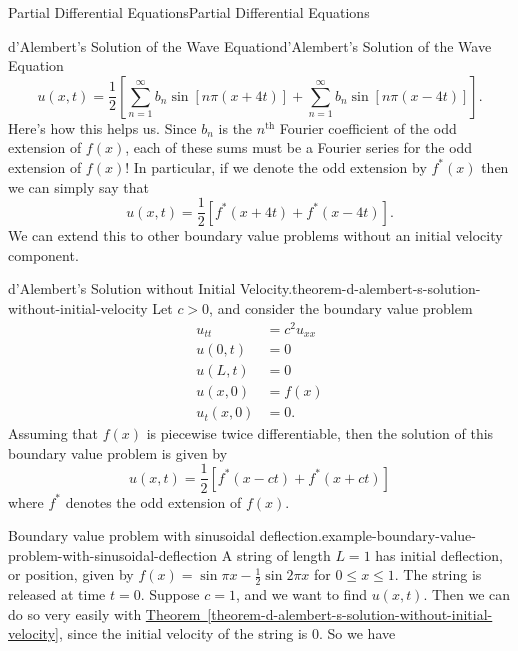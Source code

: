 \documentclass[10pt,]{book}
\numberwithin{equation}{section}
\renewcommand{\th}{\text{th}}
\newcommand{\gt}{>}
\begin{document}
\begin{chapterptx}{Partial Differential Equations}{}{Partial Differential Equations}{}{}
\begin{sectionptx}{d'Alembert's Solution of the Wave Equation}{}{d'Alembert's Solution of the Wave Equation}{}{}
%
\begin{equation*}
u(x,t) = \frac{1}{2}\left[\sum_{n=1}^{\infty}b_{n}\sin[n\pi(x+4t)] + \sum_{n=1}^{\infty}b_{n}\sin[n\pi(x-4t)]\right].
\end{equation*}
\hypertarget{p-487}{}%
Here's how this helps us. Since \(b_{n}\) is the \(n^{\th}\) Fourier coefficient of the odd extension of \(f(x)\), each of these sums must be a Fourier series for the odd extension of \(f(x)\)! In particular, if we denote the odd extension by \(f^{*}(x)\) then we can simply say that%
%
\begin{equation*}
u(x,t) = \frac{1}{2}[f^{*}(x+4t)+f^{*}(x-4t)].
\end{equation*}
\hypertarget{p-488}{}%
We can extend this to other boundary value problems without an initial velocity component.%
\begin{theorem}{d'Alembert's Solution without Initial Velocity.}{}{theorem-d-alembert-s-solution-without-initial-velocity}%
\hypertarget{p-489}{}%
Let \(c\gt0\), and consider the boundary value problem%
%
\begin{align*}
u_{tt} & = c^{2}u_{xx} \\
u(0,t) & = 0 \\
u(L,t) & = 0 \\
u(x,0) & = f(x) \\
u_{t}(x,0) & = 0. 
\end{align*}
\hypertarget{p-490}{}%
Assuming that \(f(x)\) is piecewise twice differentiable, then the solution of this boundary value problem is given by%
%
\begin{equation*}
u(x,t) = \frac{1}{2}[f^{*}(x-ct)+f^{*}(x+ct)]
\end{equation*}
\hypertarget{p-491}{}%
where \(f^{*}\) denotes the odd extension of \(f(x)\).%
\end{theorem}
\begin{example}{Boundary value problem with sinusoidal deflection.}{example-boundary-value-problem-with-sinusoidal-deflection}%
\hypertarget{p-492}{}%
A string of length \(L=1\) has initial deflection, or position, given by \(f(x) = \sin\pi x - \frac{1}{2}\sin2\pi x\) for \(0\leq x\leq 1\). The string is released at time \(t=0\). Suppose \(c=1\), and we want to find \(u(x,t)\). Then we can do so very easily with \hyperref[theorem-d-alembert-s-solution-without-initial-velocity]{Theorem~\ref{theorem-d-alembert-s-solution-without-initial-velocity}}, since the initial velocity of the string is \(0\). So we have%
%
\begin{equation*}

\end{equation*}
\end{example}
\end{sectionptx}
\end{chapterptx}
\end{document}
